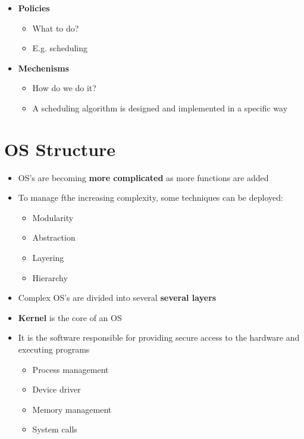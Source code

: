 \documentclass{article}
\begin{document}
\begin{itemize}
\begin{itemize}[-]
        \end{itemize}
    \item \textbf{\color{blue!45!white} Policies}
        \begin{itemize}[-]
            \item What to do?
            \item E.g. scheduling
        \end{itemize}
    \item \textbf{\color{blue!45!white} Mechenisms}
        \begin{itemize}[-]
            \item How do we do it?
            \item A scheduling algorithm is designed and implemented in a specific way
        \end{itemize}
\end{itemize}

\section{OS Structure}
\begin{itemize}
    \item OS's are becoming \textbf{\color{red!45!white} more complicated} as more functions are added
    \item To manage fthe increasing complexity, some techniques can be deployed:
        \begin{itemize}[-]
            \color{blue!45!white}
            \item Modularity
            \item Abstraction
            \item Layering
            \item Hierarchy
        \end{itemize}
    \item Complex OS's are divided into several \textbf{\color{blue!45!white} several layers}
    \item \textbf{\color{blue!45!white}Kernel} is the core of an OS
    \item It is the software responsible for providing secure access to the hardware and executing programs
        \begin{itemize}[-]
            \color{blue!45!white}
            \item Process management
            \item Device driver
            \item Memory management
            \item System calls
        \end{itemize}
\end{itemize}
\end{document}

